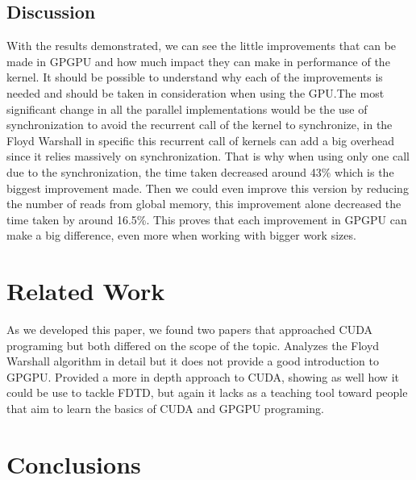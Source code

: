 \documentclass[conference]{IEEEtran}
\begin{document}
\subsection{Discussion}

With the results demonstrated, we can see the little improvements that can be made in GPGPU and how much impact they can make in performance of the kernel. It should be possible to understand why each of the improvements is needed and should be taken in consideration when using the GPU.The most significant change in all the parallel implementations would be the use of synchronization to avoid the recurrent call of the kernel to synchronize, in the Floyd Warshall in specific this recurrent call of kernels can add a big overhead since it relies massively on synchronization. That is why when using only one call due to the synchronization, the time taken decreased around 43\% which is the biggest improvement made. Then we could even improve this version by reducing the number of reads from global memory, this improvement alone decreased the time taken by around 16.5\%. This proves that each improvement in GPGPU can make a big difference, even more when working with bigger work sizes.

\section{Related Work}

As we developed this paper, we found two papers that approached CUDA programing but both differed on the scope of the topic. \cite{floyd warshall}Analyzes the Floyd Warshall algorithm in detail but it does not provide a good introduction to GPGPU. \cite{study on FDTD}Provided a more in depth approach to CUDA, showing as well how it could be use to tackle FDTD, but again it lacks as a teaching tool toward people that aim to learn the basics of CUDA and GPGPU programing.

\section{Conclusions}
\end{document}
